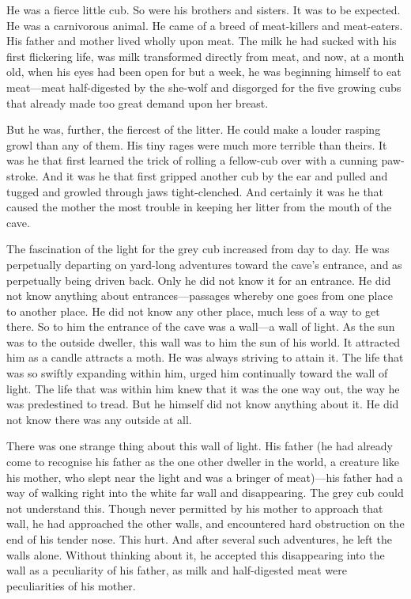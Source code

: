 \documentclass[10pt]{book}
\begin{document}
He was a fierce little cub. So were his brothers and sisters. It was to
be expected. He was a carnivorous animal. He came of a breed of
meat-killers and meat-eaters. His father and mother lived wholly upon
meat. The milk he had sucked with his first flickering life, was milk
transformed directly from meat, and now, at a month old, when his eyes
had been open for but a week, he was beginning himself to eat meat—meat
half-digested by the she-wolf and disgorged for the five growing cubs
that already made too great demand upon her breast.

But he was, further, the fiercest of the litter. He could make a louder
rasping growl than any of them. His tiny rages were much more terrible
than theirs. It was he that first learned the trick of rolling a
fellow-cub over with a cunning paw-stroke. And it was he that first
gripped another cub by the ear and pulled and tugged and growled
through jaws tight-clenched. And certainly it was he that caused the
mother the most trouble in keeping her litter from the mouth of the
cave.

The fascination of the light for the grey cub increased from day to
day. He was perpetually departing on yard-long adventures toward the
cave’s entrance, and as perpetually being driven back. Only he did not
know it for an entrance. He did not know anything about
entrances—passages whereby one goes from one place to another place. He
did not know any other place, much less of a way to get there. So to
him the entrance of the cave was a wall—a wall of light. As the sun was
to the outside dweller, this wall was to him the sun of his world. It
attracted him as a candle attracts a moth. He was always striving to
attain it. The life that was so swiftly expanding within him, urged him
continually toward the wall of light. The life that was within him knew
that it was the one way out, the way he was predestined to tread. But
he himself did not know anything about it. He did not know there was
any outside at all.

There was one strange thing about this wall of light. His father (he
had already come to recognise his father as the one other dweller in
the world, a creature like his mother, who slept near the light and was
a bringer of meat)—his father had a way of walking right into the white
far wall and disappearing. The grey cub could not understand this.
Though never permitted by his mother to approach that wall, he had
approached the other walls, and encountered hard obstruction on the end
of his tender nose. This hurt. And after several such adventures, he
left the walls alone. Without thinking about it, he accepted this
disappearing into the wall as a peculiarity of his father, as milk and
half-digested meat were peculiarities of his mother.
\end{document}
